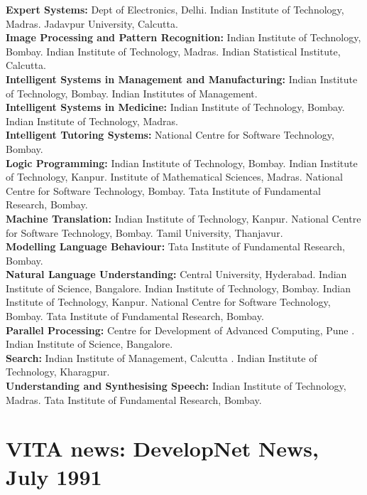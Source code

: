 {\bf Expert Systems:} Dept of Electronics, Delhi.
     Indian Institute of Technology, Madras.
     Jadavpur University, Calcutta.\\
{\bf Image Processing and Pattern Recognition:}
     Indian Institute of Technology, Bombay.
     Indian Institute of Technology, Madras.
     Indian Statistical Institute, Calcutta.\\
{\bf Intelligent Systems in Management and Manufacturing:}
     Indian Institute of Technology, Bombay.
     Indian Institutes of Management.\\
{\bf Intelligent Systems in Medicine:}
     Indian Institute of Technology, Bombay.
     Indian Institute of Technology, Madras.\\
{\bf Intelligent Tutoring Systems:}
     National Centre for Software Technology, Bombay.\\
{\bf Logic Programming:}
     Indian Institute of Technology, Bombay.
     Indian Institute of Technology, Kanpur.
     Institute of Mathematical Sciences, Madras.
     National Centre for Software Technology, Bombay. Tata Institute
of Fundamental Research, Bombay. \\
{\bf Machine Translation:}
     Indian Institute of Technology, Kanpur.
     National Centre for Software Technology, Bombay.
     Tamil University, Thanjavur.\\
{\bf Modelling Language Behaviour:}
     Tata Institute of Fundamental Research, Bombay.\\
{\bf Natural Language Understanding:}
     Central University, Hyderabad.
     Indian Institute of Science, Bangalore.
     Indian Institute of Technology, Bombay.
     Indian Institute of Technology, Kanpur.
     National Centre for Software Technology, Bombay.
     Tata Institute of Fundamental Research, Bombay.\\
{\bf Parallel Processing:}
     Centre for Development of Advanced Computing, Pune .
     Indian Institute of Science, Bangalore.\\
{\bf Search:}
     Indian Institute of Management, Calcutta .
     Indian Institute of Technology, Kharagpur. \\
{\bf Understanding and Synthesising Speech:}
     Indian Institute of Technology, Madras.
     Tata Institute of Fundamental Research, Bombay.\\


\section{VITA news: DevelopNet News, July 1991} 
  
